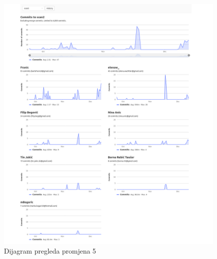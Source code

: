 		\begin{figure}[H]
			\centering
			\includegraphics[width=1.0\linewidth]{"slike/contributors_scan2"}
			\caption{Dijagram pregleda promjena 5}
			\label{Slika 6.5}
		\end{figure}
	